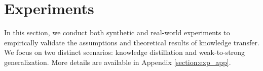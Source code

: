 \documentclass{article}
\theoremstyle{definition}
\theoremstyle{definition}
\theoremstyle{plain}
\newtheorem{theorem}{Theorem}
\theoremstyle{plain}
\theoremstyle{plain}
\theoremstyle{plain}
\theoremstyle{plain}
\newcommand{\Ex}{\mathbb{E}}
\newcommand{\te}{\mathrm{T}}
\newcommand{\st}{\mathrm{S}}
\begin{document}



\section{Experiments}
\label{section:exp}
In this section, we conduct both synthetic and real-world experiments to empirically validate the assumptions and theoretical results of knowledge transfer. We focus on two distinct scenarios: knowledge distillation and weak-to-strong generalization. More details are  available in Appendix \ref{section:exp_app}.
\end{document}
